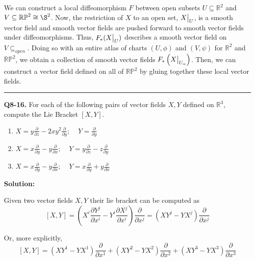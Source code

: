 \documentclass{article}
\newcommand{\R}{\mathbb{R}}
\newcommand{\restr}[2]{{%
  \left.\kern-\nulldelimiterspace %
  #1 %
  \vphantom{\big|} %
  \right|_{#2} %
  }}
\begin{document}
We can construct a local diffeomorphism $F$ between open subsets $U \subseteq \R^2$ and $V \subseteq \mathbb{RP}^2 \cong \S^2$. Now, the restriction of $X$ to an open set, $\restr{X}{U}$, is a smooth vector field and smooth vector fields are pushed forward to smooth vector fields under diffeomorphisms. Thus, $F_*(\restr{X}{U})$ describes a smooth vector field on $V \subseteq_{open}$. Doing so with an entire atlas of charts $(U, \phi)$ and $(V, \psi)$ for $\R^2$ and $\mathbb{RP}^2$, we obtain a collection of smooth vector fields $F_*\left(\restr{X}{U_{\alpha}}\right)$. Then, we can construct a vector field defined on all of $\mathbb{RP}^2$ by gluing together these local vector fields.


\vskip 0.5cm
\hrule 
\vskip 0.5cm


\textbf{Q8-16.} For each of the following pairs of vector fields $X, Y$ defined on $\R^3$, compute the Lie Bracket $\left[ X, Y\right]$.
\begin{enumerate}[label=(\alph*)]
  \item $X = y \frac{\partial}{\partial z} - 2xy^2 \frac{\partial}{\partial y};\;\;\;\; Y = \frac{\partial}{\partial y}$
  
  \item $X = x \frac{\partial}{\partial y} - y \frac{\partial}{\partial x};\;\;\;\; Y = y \frac{\partial}{\partial z} - z \frac{\partial }{\partial y}$
  
  \item $X = x \frac{\partial}{\partial y} - y \frac{\partial}{\partial x};\;\;\;\; Y = x \frac{\partial}{\partial y} + y \frac{\partial}{\partial x}$ 
\end{enumerate}

\vskip 0.5cm
\textbf{Solution:}

Given two vector fields $X, Y$ their lie bracket can be computed as 
\[ [X, Y] = \left( X^i \frac{\partial Y^j}{\partial x^i} - Y^i \frac{\partial X^j}{\partial x^i}  \right) \frac{\partial}{\partial x^j} = \left( XY^j - YX^j \right) \frac{\partial}{\partial x^j}  \] 

Or, more explicitly, 
\[ [X, Y] = \left( X Y^1 - YX^1 \right) \frac{\partial }{ \partial x^1} + \left( X Y^2 - YX^2 \right) \frac{\partial }{ \partial x^2} + \left( X Y^3 - YX^3 \right) \frac{\partial }{ \partial x^3} \]
\end{document}
